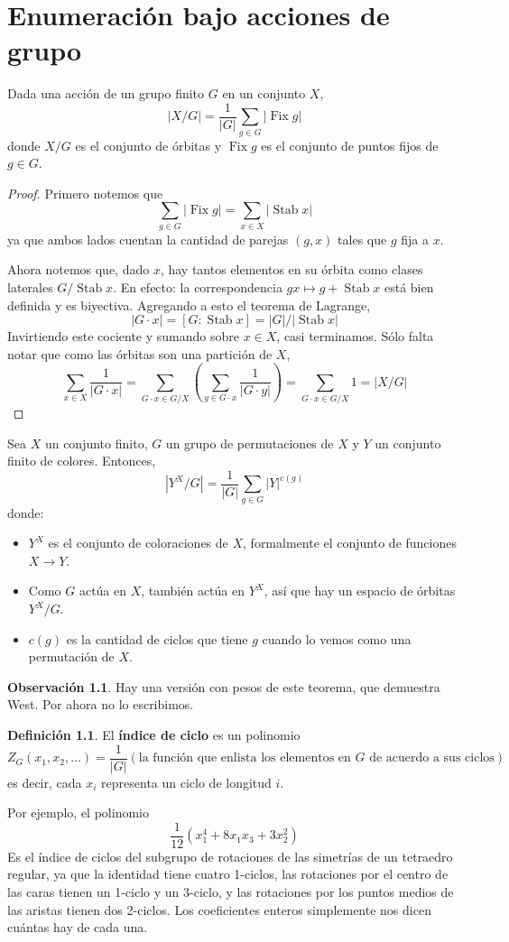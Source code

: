 \documentclass[spanish]{book}
\theoremstyle{definition}
\newtheorem*{defn}{Definición}
\newtheorem*{obs}{Observación}
\DeclareMathOperator{\Fix}{Fix}
\DeclareMathOperator{\Stab}{Stab}
\begin{document}
\chapter{Enumeración bajo acciones de grupo}
\begin{teo}
	Dada una acción de un grupo finito $G$ en un conjunto $X$,
	\[|X/G|=\frac{1}{|G|}\sum_{g\in G}|\Fix g|\]
	donde $X/G$ es el conjunto de órbitas y $\Fix g$ es el conjunto de puntos fijos de $g\in G$.
\end{teo}
\begin{proof}
	Primero notemos que 
	\[\sum_{g\in G}|\Fix g|=\sum_{x\in X}|\Stab x|\]
	ya que ambos lados cuentan la cantidad de parejas $(g,x)$ tales que $g$ fija a $x$.
	
	Ahora notemos que, dado $x$, hay tantos elementos en su órbita como clases laterales  $G/\Stab x$. En efecto: la correspondencia $gx\mapsto g+\Stab x$ está bien definida y es biyectiva. Agregando a esto el teorema de Lagrange,
	\[|G\cdot x|=[G:\Stab x]=|G|/|\Stab x|\]
	Invirtiendo este cociente y sumando sobre $x\in X$, casi terminamos. Sólo falta notar que como las órbitas son una partición de $X$,
	\[\sum_{x\in X}\frac{1}{|G\cdot x|}=\sum_{G\cdot x\in G/X}\left(\sum_{y\in G\cdot x}\frac{1}{|G\cdot y|}\right)=\sum_{G\cdot x\in G/X}1=|X/G|\]
\end{proof}
\begin{teo}
	Sea $X$ un conjunto finito, $G$ un grupo de permutaciones de $X$ y $Y$ un conjunto finito de colores. Entonces,
	\[|Y^X/G|=\frac{1}{|G|}\sum_{g\in G}|Y|^{c(g)}\]
	donde:
	\begin{itemize}
		\item $Y^X$ es el conjunto de coloraciones de $X$, formalmente el conjunto de funciones $X\to Y$.
		\item Como $G$ actúa en $X$, también actúa en $Y^X$, así que hay un espacio de órbitas $Y^X/G$.
		\item $c(g)$ es la cantidad de ciclos que tiene $g$ cuando lo vemos como una permutación de $X$.
	\end{itemize}
\end{teo}
\begin{obs}
	Hay una versión con pesos de este teorema, que demuestra West. Por ahora no lo escribimos.
\end{obs}
\begin{defn}
	El \textbf{índice de ciclo} es un polinomio
	\[Z_G(x_1,x_2,\ldots)=\frac{1}{|G|}(\text{la función que enlista los elementos en }G\text{ de acuerdo a sus ciclos})\]
	es decir, cada $x_i$ representa un ciclo de longitud $i$.
\end{defn}
Por ejemplo, el polinomio
\[\frac{1}{12}(x^4_1+8x_1x_3+3x^2_2)\]
Es el índice de ciclos del subgrupo de rotaciones de las simetrías de un tetraedro regular, ya que la identidad tiene cuatro 1-ciclos, las rotaciones por el centro de las caras tienen un 1-ciclo y un 3-ciclo, y las rotaciones por los puntos medios de las aristas tienen dos 2-ciclos. Los coeficientes enteros simplemente nos dicen cuántas hay de cada una.
\end{document}
